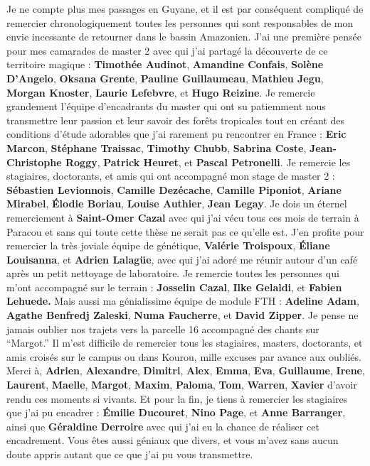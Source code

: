 \documentclass[12pt,twoside,a4paper, a]{article}
\begin{document}
Je ne compte plus mes passages en Guyane, et il est par conséquent
compliqué de remercier chronologiquement toutes les personnes qui sont
responsables de mon envie incessante de retourner dans le bassin
Amazonien. J'ai une première pensée pour mes camarades de master 2 avec
qui j'ai partagé la découverte de ce territoire magique : \textbf{Timothée
Audinot}, \textbf{Amandine Confais}, \textbf{Solène D'Angelo}, \textbf{Oksana Grente},
\textbf{Pauline Guillaumeau}, \textbf{Mathieu Jegu}, \textbf{Morgan Knoster}, \textbf{Laurie
Lefebvre}, et \textbf{Hugo Reizine}. Je remercie grandement l'équipe
d'encadrants du master qui ont su patiemment nous transmettre leur
passion et leur savoir des forêts tropicales tout en créant des
conditions d'étude adorables que j'ai rarement pu rencontrer en France :
\textbf{Eric Marcon}, \textbf{Stéphane Traissac}, \textbf{Timothy Chubb}, \textbf{Sabrina
Coste}, \textbf{Jean-Christophe Roggy}, \textbf{Patrick Heuret}, et \textbf{Pascal
Petronelli}. Je remercie les stagiaires, doctorants, et amis qui ont
accompagné mon stage de master 2 : \textbf{Sébastien Levionnois}, \textbf{Camille
Dezécache}, \textbf{Camille Piponiot}, \textbf{Ariane Mirabel}, \textbf{Élodie
Boriau}, \textbf{Louise Authier}, \textbf{Jean Legay}. Je dois un éternel
remerciement à \textbf{Saint-Omer Cazal} avec qui j'ai vécu tous ces mois de
terrain à Paracou et sans qui toute cette thèse ne serait pas ce qu'elle
est. J'en profite pour remercier la très joviale équipe de génétique,
\textbf{Valérie Troispoux}, \textbf{Éliane Louisanna}, et \textbf{Adrien Lalagüe}, avec
qui j'ai adoré me réunir autour d'un café après un petit nettoyage de
laboratoire. Je remercie toutes les personnes qui m'ont accompagné sur
le terrain : \textbf{Josselin Cazal}, \textbf{Ilke Gelaldi}, et \textbf{Fabien
Lehuede.} Mais aussi ma génialissime équipe de module FTH : \textbf{Adeline
Adam}, \textbf{Agathe Benfredj Zaleski}, \textbf{Numa Faucherre}, et \textbf{David
Zipper}. Je pense ne jamais oublier nos trajets vers la parcelle 16
accompagné des chants sur ``Margot.'' Il m'est difficile de remercier tous
les stagiaires, masters, doctorants, et amis croisés sur le campus ou
dans Kourou, mille excuses par avance aux oubliés. Merci à, \textbf{Adrien},
\textbf{Alexandre}, \textbf{Dimitri}, \textbf{Alex}, \textbf{Emma}, \textbf{Eva}, \textbf{Guillaume},
\textbf{Irene}, \textbf{Laurent}, \textbf{Maelle}, \textbf{Margot}, \textbf{Maxim}, \textbf{Paloma},
\textbf{Tom}, \textbf{Warren}, \textbf{Xavier} d'avoir rendu ces moments si vivants. Et
pour la fin, je tiens à remercier les stagiaires que j'ai pu encadrer :
\textbf{Émilie Ducouret}, \textbf{Nino Page}, et \textbf{Anne Barranger}, ainsi que \textbf{Géraldine Derroire}
avec qui j'ai eu la chance de réaliser cet encadrement. Vous êtes
aussi géniaux que divers, et vous m'avez sans aucun doute appris autant
que ce que j'ai pu vous transmettre.
\end{document}
